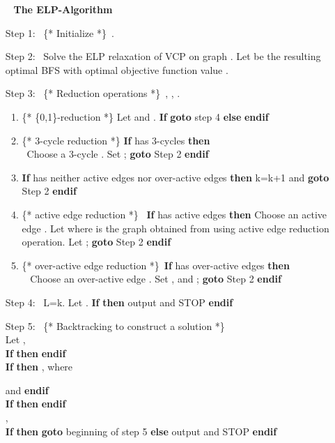 \documentclass[12pt]{article}
\begin{document}
\vskip 10pt
\begin{itemize}
\item[~] {\large\bf The ELP-Algorithm}
\item[Step 1:~] \{* \textsf{Initialize} *\}\
.
\item[Step 2:~] Solve the ELP relaxation of VCP on graph . Let
 be the resulting optimal BFS with
optimal objective function value .
\item[Step 3:~] \{* \textsf{Reduction operations}
*\}\ ,  , .
\begin{enumerate}
\item \{* \textsf{\{0,1\}-reduction} *\} Let  and .
\textbf{If}  \textbf{goto}
step 4 \textbf{else}   \textbf{endif}
\item \{* \textsf{3-cycle reduction} *\} \textbf{If}  has 3-cycles \textbf{then} \\
     \mbox{ }Choose a 3-cycle . Set ;
      \textbf{goto} Step 2 \textbf{endif}
\item \textbf{If}  has neither active edges  nor over-active edges \textbf{then} k=k+1 and \textbf{goto} Step 2 \textbf{endif}
\item \{* \textsf{active edge reduction} *\} \ \textbf{If}  has active edges \textbf{then}
 Choose an active
edge . Let  where  is the
graph obtained from  using  active edge reduction operation.
Let ; 
\textbf{goto} Step 2 \textbf{endif}
\item \{* \textsf{over-active edge reduction} *\}\ \textbf{If}  has over-active edges \textbf{then} \\
     \mbox{ } Choose an over-active edge . Set , and ;
      \textbf{goto} Step 2 \textbf{endif}
\end{enumerate}
\item[Step 4:~] L=k.  Let . \textbf{If}  \textbf{then} output
 and STOP \textbf{endif}
\item[Step 5:~] \{* \textsf{Backtracking to construct a solution} *\}\\
Let ,\\
\textbf{If}  \textbf{then}
 \textbf{endif}\\
\textbf{If}  \textbf{then}
, where

 and  \textbf{endif}\\
\textbf{If}  \textbf{then}
 \textbf{endif}\\
,\\ \textbf{If}  \textbf{then} \textbf{goto}
beginning of step 5 \textbf{else} output  and STOP
\textbf{endif}
 \end{itemize}
\end{document}
